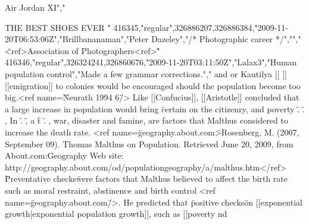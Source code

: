 { Air Jordan XI","

  THE BEST SHOES EVER "
416345,"regular",326886207,326886384,"2009-11-20T06:53:06Z","Brillbananaman","Peter Dazeley","/* Photographic career */","","\"<ref>Association of Photographers<ref>\" "
416346,"regular",326324241,326860676,"2009-11-20T03:11:50Z","Lalax3","Human
population control","Made a few grammar corrections."," and or  Kautilya [[ ]]
[[emigration]] to colonies would be encouraged should the population become too
big.<ref name=\"Neurath 1994 6\"/> Like [[Confucius]], [[Aristotle]] concluded
that a large increase in population would bring \"certain  on the citizenry,
and poverty  \". \". , In \". \", a  \"t \". , war, disaster and famine, are
factors that Malthus considered to increase the death rate. <ref
name=\"geography.about.com\">Rosenberg, M. (2007, September 09). Thomas Malthus
on Population. Retrieved June 20, 2009, from About.com:Geography Web site:
http://geography.about.com/od/populationgeography/a/malthus.htm</ref>
\"Preventative checks\" were factors that Malthus believed to affect the birth
rate such as moral restraint, abstinence and birth control <ref
name=\"geography.about.com\"/>. He predicted that \"positive checks\" on
[[exponential growth|exponential population growth]], such as [[poverty nd
}
